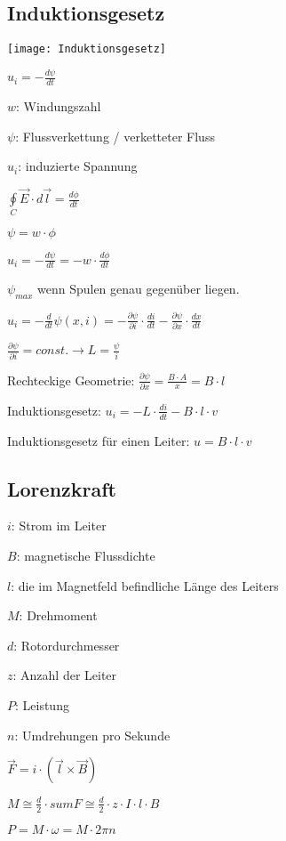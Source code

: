\documentclass[german]{latex4ei/latex4ei_sheet}
\begin{document}
			\begin{sectionbox}
				\subsection{Induktionsgesetz}

					\begin{symbolbox}
						\item \texttt{[image: Induktionsgesetz]} 
						\item \hspace{1cm}$u_i= -\frac{d\psi}{dt}$
						\item $w$: Windungszahl
						\item $\psi$: Flussverkettung / verketteter Fluss
						\item $u_i$: induzierte Spannung
						\item $\oint\limits_{C} \vec{E}\cdot d \vec{l} = \frac{d\phi}{dt}$ 
						\item $\psi = w\cdot \phi$
						\item $u_i = -\frac{d\psi}{dt} = -w\cdot \frac{d\phi}{dt}$
						\item $\psi_{max}$ wenn Spulen genau gegenüber liegen.
						\item $u_i = -\frac{d}{dt}\psi(x,i)= -\frac{\partial\psi}{\partial i}\cdot \frac{di}{dt}-\frac{\partial \psi}{\partial x}\cdot \frac{dx}{dt}$
						\item $\frac{\partial \psi}{\partial i} = const. \rightarrow L = \frac{\psi}{i}$
						\item Rechteckige Geometrie: $\frac{\partial \psi}{\partial x} = \frac{B\cdot A}{x} = B \cdot l$
						\item Induktionsgesetz: $u_i = -L\cdot \frac{di}{dt}-B\cdot l\cdot v$ 
						\item Induktionsgesetz für einen Leiter: $u = B\cdot l\cdot v$
					\end{symbolbox}
				\subsection{Lorenzkraft}
					\begin{bluebox}
						\item $i$: Strom im Leiter
						\item $B$: magnetische Flussdichte
						\item $l$: die im Magnetfeld befindliche Länge des Leiters
						\item $M$: Drehmoment
						\item $d$: Rotordurchmesser
						\item $z$: Anzahl der Leiter
						\item $P$: Leistung
						\item $n$: Umdrehungen pro Sekunde
						\item $\vec{F} = i\cdot (\vec{l}\times \vec{B})$
						\item $M \cong  \frac{d}{2}\cdot sum F \cong \frac{d}{2}\cdot z\cdot I\cdot l \cdot B$
						\item $P = M \cdot \omega = M \cdot 2\pi n$
					\end{bluebox}

\end{sectionbox}
\end{document}
